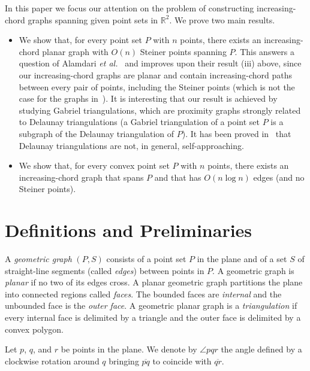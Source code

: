 \documentclass{llncs}
\begin{document}
In this paper we focus our attention on the problem of constructing increasing-chord graphs spanning given point sets in $\mathbb R^2$. We prove two main results.

\begin{itemize}
\item We show that, for every point set $P$ with $n$ points, there exists an increasing-chord planar graph with $O(n)$ Steiner points spanning $P$. This answers a question of Alamdari {\em et al.}~\cite{acglp-sag-12} and improves upon their result (iii) above, since our increasing-chord graphs are planar and contain increasing-chord paths between every pair of points, including the Steiner points (which is not the case for the graphs in~\cite{acglp-sag-12}). It is interesting that our result is achieved by studying Gabriel triangulations, which are proximity graphs strongly related to Delaunay triangulations (a Gabriel triangulation of a point set $P$ is a subgraph of the Delaunay triangulation of $P$). It has been proved in~\cite{acglp-sag-12} that Delaunay triangulations are not, in general, self-approaching.
\item We show that, for every convex point set $P$ with $n$ points, there exists an increasing-chord graph that spans $P$ and that has $O(n \log n)$ edges (and no Steiner points).
\end{itemize}

\section{Definitions and Preliminaries} \label{se:preliminaries}

A {\em geometric graph} $(P,S)$ consists of a point set $P$ in the plane and of a set $S$ of straight-line segments (called {\em edges}) between points in $P$. A geometric graph is {\em planar} if no two of its edges cross. A planar geometric graph partitions the plane into connected regions called {\em faces}. The bounded faces are {\em internal} and the unbounded face is the {\em outer face}. A geometric planar graph is a {\em triangulation} if every internal face is delimited by a triangle and the outer face is delimited by a convex polygon.

Let $p$, $q$, and $r$ be points in the plane. We denote by $\angle{pqr}$ the angle defined by a clockwise rotation around $q$ bringing $\overline{pq}$ to coincide with $\overline{qr}$.
\end{document}
